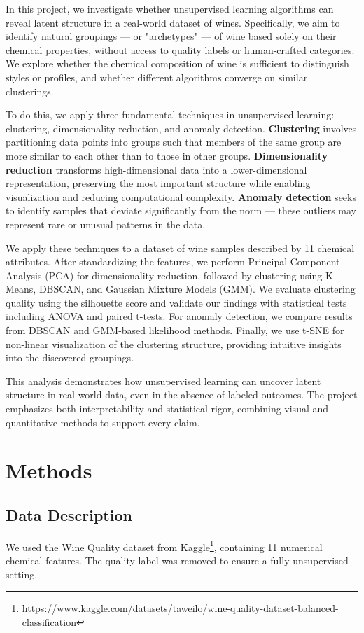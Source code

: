 \documentclass[12pt]{article}
\begin{document}
In this project, we investigate whether unsupervised learning algorithms can reveal latent structure in a real-world dataset of wines. Specifically, we aim to identify natural groupings — or "archetypes" — of wine based solely on their chemical properties, without access to quality labels or human-crafted categories. We explore whether the chemical composition of wine is sufficient to distinguish styles or profiles, and whether different algorithms converge on similar clusterings.

To do this, we apply three fundamental techniques in unsupervised learning: clustering, dimensionality reduction, and anomaly detection.
\textbf{Clustering} involves partitioning data points into groups such that members of the same group are more similar to each other than to those in other groups. \textbf{Dimensionality reduction} transforms high-dimensional data into a lower-dimensional representation, preserving the most important structure while enabling visualization and reducing computational complexity. 
\textbf{Anomaly detection} seeks to identify samples that deviate significantly from the norm — these outliers may represent rare or unusual patterns in the data.

We apply these techniques to a dataset of wine samples described by 11 chemical attributes. After standardizing the features, we perform Principal Component Analysis (PCA) for dimensionality reduction, followed by clustering using K-Means, DBSCAN, and Gaussian Mixture Models (GMM). We evaluate clustering quality using the silhouette score and validate our findings with statistical tests including ANOVA and paired t-tests. For anomaly detection, we compare results from DBSCAN and GMM-based likelihood methods. Finally, we use t-SNE for non-linear visualization of the clustering structure, providing intuitive insights into the discovered groupings.

This analysis demonstrates how unsupervised learning can uncover latent structure in real-world data, even in the absence of labeled outcomes. The project emphasizes both interpretability and statistical rigor, combining visual and quantitative methods to support every claim.


\section{Methods}

\subsection*{Data Description}
We used the Wine Quality dataset from Kaggle\footnote{\url{https://www.kaggle.com/datasets/taweilo/wine-quality-dataset-balanced-classification}}, containing 11 numerical chemical features. The quality label was removed to ensure a fully unsupervised setting.
\end{document}
